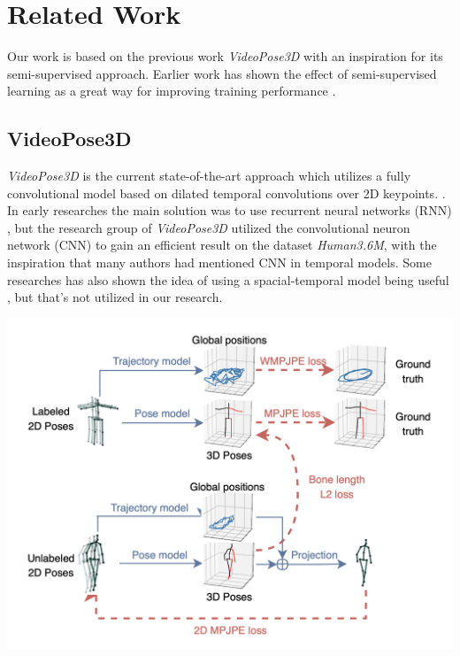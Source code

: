 \documentclass[10pt,twocolumn,letterpaper]{article}
\begin{document}
\section{Related Work}

Our work is based on the previous work \textit{VideoPose3D} with an inspiration for its
semi-supervised approach. Earlier work has shown the effect of semi-supervised learning
as a great way for improving training performance \cite{zhu2009introduction}. 

\subsection{VideoPose3D}


\textit{VideoPose3D} is the current state-of-the-art approach which utilizes a fully 
convolutional model based on dilated temporal convolutions over 2D keypoints. 
\cite{pavlakos2017coarse,pavllo20193d}. In early researches the main solution
was to use recurrent neural networks (RNN) \cite{lee2018propagating}, but the research
group of \textit{VideoPose3D} utilized the convolutional neuron network (CNN) to gain
an efficient result on the dataset \textit{Human3.6M}, with the inspiration that
many authors had mentioned CNN in temporal models. Some researches has also shown the 
idea of using a spacial-temporal model being useful \cite{7298734}, but that's not utilized in our 
research.

\includegraphics[scale=0.25]{original.png}
\end{document}
